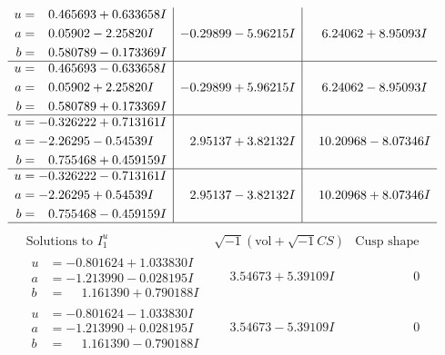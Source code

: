 \documentclass[1p]{elsarticle_modified}
\theoremstyle{definition}
\newcommand{\I}{\sqrt{-1}}
\begin{document}
$$\begin{array}{c|c|c}
\begin{aligned}
u &= \phantom{-}0.465693 + 0.633658 I \\
a &= \phantom{-}0.05902 - 2.25820 I \\
b &= \phantom{-}0.580789 - 0.173369 I\end{aligned}
 & -0.29899 - 5.96215 I & \phantom{-}6.24062 + 8.95093 I \\ \hline\begin{aligned}
u &= \phantom{-}0.465693 - 0.633658 I \\
a &= \phantom{-}0.05902 + 2.25820 I \\
b &= \phantom{-}0.580789 + 0.173369 I\end{aligned}
 & -0.29899 + 5.96215 I & \phantom{-}6.24062 - 8.95093 I \\ \hline\begin{aligned}
u &= -0.326222 + 0.713161 I \\
a &= -2.26295 - 0.54539 I \\
b &= \phantom{-}0.755468 + 0.459159 I\end{aligned}
 & \phantom{-}2.95137 + 3.82132 I & \phantom{-}10.20968 - 8.07346 I \\ \hline\begin{aligned}
u &= -0.326222 - 0.713161 I \\
a &= -2.26295 + 0.54539 I \\
b &= \phantom{-}0.755468 - 0.459159 I\end{aligned}
 & \phantom{-}2.95137 - 3.82132 I & \phantom{-}10.20968 + 8.07346 I\\
 \hline 
 \end{array}$$\newpage$$\begin{array}{c|c|c}  
\text{Solutions to }I^u_{1}& \I (\text{vol} + \sqrt{-1}CS) & \text{Cusp shape}\\
 \hline 
\begin{aligned}
u &= -0.801624 + 1.033830 I \\
a &= -1.213990 - 0.028195 I \\
b &= \phantom{-}1.161390 + 0.790188 I\end{aligned}
 & \phantom{-}3.54673 + 5.39109 I & \phantom{-0.000000 } 0 \\ \hline\begin{aligned}
u &= -0.801624 - 1.033830 I \\
a &= -1.213990 + 0.028195 I \\
b &= \phantom{-}1.161390 - 0.790188 I\end{aligned}
 & \phantom{-}3.54673 - 5.39109 I & \phantom{-0.000000 } 0 \\ \hline\begin{aligned}

\end{aligned}
\end{array}$$
\end{document}
